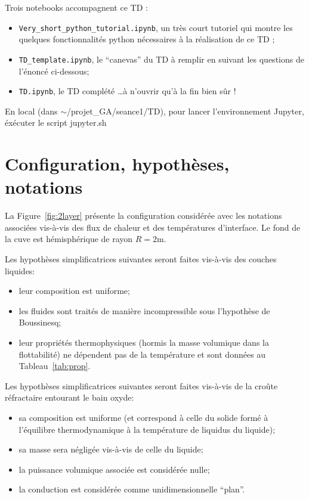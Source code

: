 \documentclass[3p]{elsarticle}
\newcommand{\Fig}[1]{Figure~\ref{fig:#1}}
\newcommand{\Tab}[1]{Tableau~\ref{tab:#1}}
\newcounter{question}
\begin{document}
Trois notebooks accompagnent ce TD :
\begin{itemize}
 \item \texttt{Very\_short\_python\_tutorial.ipynb}, un très court tutoriel qui montre les quelques fonctionnalités python nécessaires à la réalisation de ce TD ;
 \item \texttt{TD\_template.ipynb}, le ``canevas'' du TD à remplir en suivant les questions de l'énoncé ci-dessous;
 \item \texttt{TD.ipynb}, le TD complété \dots à n'ouvrir qu'à la fin bien sûr !
\end{itemize}

En local (dans $\sim$/projet\_GA/seance1/TD), pour lancer l'environnement Jupyter, éxécuter le script jupyter.sh

\section{Configuration, hypothèses, notations} \label{sect:sci}

La \Fig{2layer} présente la configuration considérée avec les notations associées vis-à-vis des flux de chaleur et des températures d'interface. Le fond de la cuve est hémisphérique de rayon $R=2$m. 

Les hypothèses simplificatrices suivantes seront faites vis-à-vis des couches liquides:
\begin{itemize}
 \item leur composition est uniforme;
 \item les fluides sont traités de manière incompressible sous l'hypothèse de Boussinesq;
 \item leur propriétés thermophysiques (hormis la masse volumique dans la flottabilité) ne dépendent pas de la température et sont données au \Tab{prop}.
\end{itemize}

Les hypothèses simplificatrices suivantes seront faites vis-à-vis de la croûte réfractaire entourant le bain oxyde:
\begin{itemize}
 \item sa composition est uniforme (et correspond à celle du solide formé à l'équilibre thermodynamique à la température de liquidus du liquide);
 \item sa masse sera négligée vis-à-vis de celle du liquide;
 \item la puissance volumique associée est considérée nulle;
 \item la conduction est considérée comme unidimensionnelle ``plan''.
\end{itemize}
\end{document}
